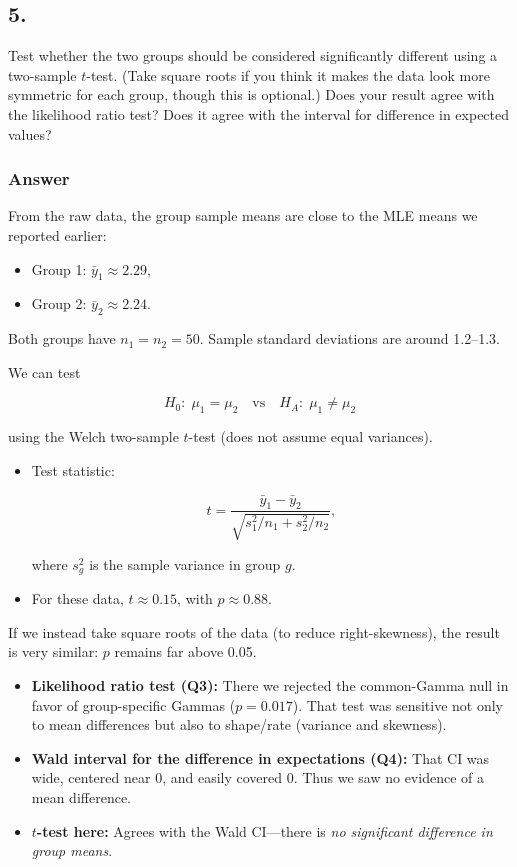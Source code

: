 \documentclass[
]{article}
\providecommand{\tightlist}{%
  \setlength{\itemsep}{0pt}\setlength{\parskip}{0pt}}
\begin{document}
\newpage

\subsection{5.}\label{section-4}

Test whether the two groups should be considered significantly different
using a two-sample \(t\)-test. (Take square roots if you think it makes
the data look more symmetric for each group, though this is optional.)
Does your result agree with the likelihood ratio test? Does it agree
with the interval for difference in expected values?

\subsubsection{Answer}\label{answer-4}

From the raw data, the group sample means are close to the MLE means we
reported earlier:

\begin{itemize}
\tightlist
\item
  Group 1: \(\bar y_1 \approx 2.29\),
\item
  Group 2: \(\bar y_2 \approx 2.24\).
\end{itemize}

Both groups have \(n_1=n_2=50\). Sample standard deviations are around
1.2--1.3.

We can test

\[
H_0:\; \mu_1=\mu_2 \quad\text{vs}\quad H_A:\; \mu_1\ne \mu_2
\]

using the Welch two-sample \(t\)-test (does not assume equal variances).

\begin{itemize}
\item
  Test statistic:

  \[
  t = \frac{\bar y_1-\bar y_2}{\sqrt{s_1^2/n_1 + s_2^2/n_2}},
  \]

  where \(s_g^2\) is the sample variance in group \(g\).
\item
  For these data, \(t\approx 0.15\), with \(p\approx 0.88\).
\end{itemize}

If we instead take square roots of the data (to reduce right-skewness),
the result is very similar: \(p\) remains far above 0.05.

\begin{itemize}
\tightlist
\item
  \textbf{Likelihood ratio test (Q3):} There we rejected the
  common-Gamma null in favor of group-specific Gammas (\(p=0.017\)).
  That test was sensitive not only to mean differences but also to
  shape/rate (variance and skewness).
\item
  \textbf{Wald interval for the difference in expectations (Q4):} That
  CI was wide, centered near 0, and easily covered 0. Thus we saw no
  evidence of a mean difference.
\item
  \textbf{\(t\)-test here:} Agrees with the Wald CI---there is \emph{no
  significant difference in group means}.
\end{itemize}
\end{document}
